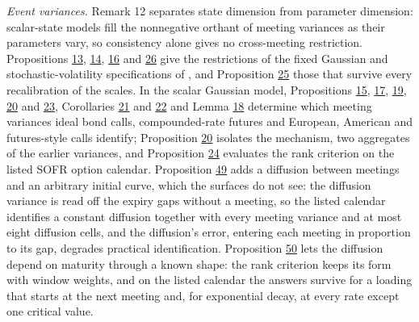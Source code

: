 \documentclass[11pt]{article}
\begin{document}
\emph{Event variances.} Remark 12 separates state dimension from parameter dimension: scalar-state models fill the nonnegative orthant of meeting variances as their parameters vary, so consistency alone gives no cross-meeting restriction. Propositions \hyperref[res:Proposition-13]{13}, \hyperref[res:Proposition-14]{14}, \hyperref[res:Proposition-16]{16} and \hyperref[res:Proposition-26]{26} give the restrictions of the fixed Gaussian and stochastic-volatility specifications of \cite{brace2024sofr}, and Proposition \hyperref[res:Proposition-25]{25} those that survive every recalibration of the scales. In the scalar Gaussian model, Propositions \hyperref[res:Proposition-15]{15}, \hyperref[res:Proposition-17]{17}, \hyperref[res:Proposition-19]{19}, \hyperref[res:Proposition-20]{20} and \hyperref[res:Proposition-23]{23}, Corollaries \hyperref[res:Corollary-21]{21} and \hyperref[res:Corollary-22]{22} and Lemma \hyperref[res:Lemma-18]{18} determine which meeting variances ideal bond calls, compounded-rate futures and European, American and futures-style calls identify; Proposition \hyperref[res:Proposition-20]{20} isolates the mechanism, two aggregates of the earlier variances, and Proposition \hyperref[res:Proposition-24]{24} evaluates the rank criterion on the listed SOFR option calendar. Proposition \hyperref[res:Proposition-49]{49} adds a diffusion between meetings and an arbitrary initial curve, which the surfaces do not see: the diffusion variance is read off the expiry gaps without a meeting, so the listed calendar identifies a constant diffusion together with every meeting variance and at most eight diffusion cells, and the diffusion's error, entering each meeting in proportion to its gap, degrades practical identification. Proposition \hyperref[res:Proposition-50]{50} lets the diffusion depend on maturity through a known shape: the rank criterion keeps its form with window weights, and on the listed calendar the answers survive for a loading that starts at the next meeting and, for exponential decay, at every rate except one critical value.
\end{document}
